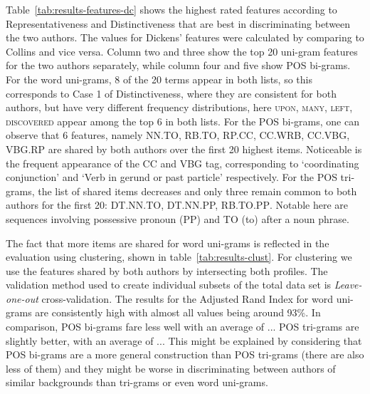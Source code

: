 \documentclass[a4paper,10pt,twoside,fleqn]{article}
\begin{document}
Table~\ref{tab:results-features-dc} shows the highest rated features
according to Representativeness and Distinctiveness that are best
in discriminating between the two authors. The values for Dickens' features
were calculated by comparing to Collins and vice versa.
Column two and three show the top 20 uni-gram features for the two authors
separately, while column four and five show POS bi-grams.
For the word uni-grams, 8 of the 20 terms appear in both lists, so this corresponds
to Case 1 of Distinctiveness, where they are consistent for both authors, but
have very different frequency distributions, here \textsc{upon, many, left, discovered}
appear among the top 6 in both lists.
For the POS bi-grams, one can observe that  6 features, namely
\textsc{NN.TO, RB.TO, RP.CC, CC.WRB, CC.VBG, VBG.RP}
are shared by both authors over the first 20 highest items.
Noticeable is the frequent appearance of the CC and VBG tag,
corresponding to `coordinating conjunction' and `Verb in gerund or
past particle' respectively.
For the POS tri-grams, the list of shared items decreases and only three remain
common to both authors for the first 20: \textsc{DT.NN.TO,  DT.NN.PP, RB.TO.PP}.
Notable here are sequences involving possessive pronoun (PP) and TO (to) after
a noun phrase.

The fact that more items are shared for word uni-grams is reflected in the evaluation using
clustering, shown in table~\ref{tab:results-clust}.
For clustering we use the features shared by both authors by intersecting both profiles.
The validation method used to create individual subsets of the total data set
is \emph{Leave-one-out} cross-validation.
The results for the Adjusted Rand Index for word uni-grams are consistently high with
almost all values being around 93\%. In comparison, POS bi-grams fare less well
with an average of ...
POS tri-grams are slightly better, with an average of ...
This might be explained by considering that POS bi-grams are a more general
construction than POS tri-grams (there are also less of them) and they might
be worse in discriminating between authors of similar backgrounds
than tri-grams or even word uni-grams.
\end{document}
